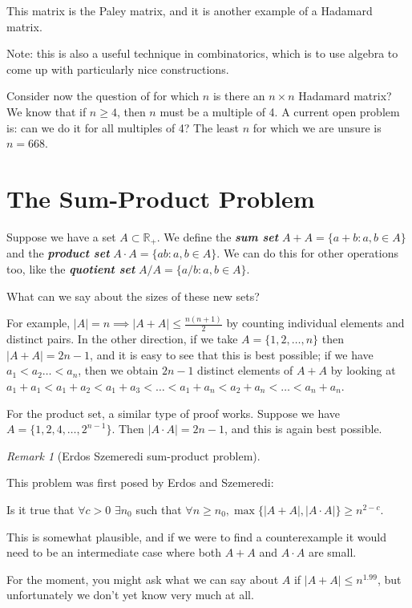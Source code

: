 \documentclass[]{article}
\theoremstyle{custhm}
\theoremstyle{cusdef}
\theoremstyle{custhm}
\theoremstyle{custhm}
\theoremstyle{custhm}
\theoremstyle{custhm}
\theoremstyle{cusdef}
\theoremstyle{remark}
\newtheorem*{remark*}{Remark}
\theoremstyle{custhm}
\newcommand{\R}{\mathbb{R}}
\newcommand{\undf}[1]{\textit{\textbf{#1}}}
\begin{document}
This matrix is the Paley matrix, and it is another example of a Hadamard matrix.

Note: this is also a useful technique in combinatorics, which is to use algebra to come up with particularly nice constructions.

Consider now the question of for which $n$ is there an $n\times n$ Hadamard matrix? We know that if $n\ge 4$, then $n$ must be a multiple of 4. A current open problem is: can we do it for all multiples of 4? The least $n$ for which we are unsure is $n = 668$.

\section{The Sum-Product Problem}

Suppose we have a set $A\subset \R_{+}$. We define the \undf{sum set} $A + A = \{a+b:a,b\in A\}$ and the \undf{product set} $A\cdot A = \{ab:a,b\in A\}$. We can do this for other operations too, like the \undf{quotient set} $A/A = \{a/b:a,b\in A\}$.

What can we say about the sizes of these new sets?

For example, $|A| = n \implies |A+A| \le \frac{n(n+1)}{2}$ by counting individual elements and distinct pairs. In the other direction, if we take $A = \{1,2,\dots,n\}$ then $|A+A| = 2n-1$, and it is easy to see that this is best possible; if we have $a_1<a_2\dots < a_n$, then we obtain $2n-1$ distinct elements of $A+A$ by looking at $a_1+a_1 < a_1 + a_2 < a_1 + a _3 <\dots <a_1 + a_n < a_2 + a_n <\dots < a_n + a_n$.

For the product set, a similar type of proof works. Suppose we have $A = \{1,2,4,\dots,2^{n-1}\}$. Then $|A\cdot A| = 2n-1$, and this is again best possible.

\begin{remark*}[Erdos Szemeredi sum-product problem]\ 

This problem was first posed by Erdos and Szemeredi:

Is it true that $\forall c > 0$ $\exists n_0$ such that $\forall n\ge n_0, \max\{|A+A|,|A\cdot A|\}\ge n^{2-c}$.
\end{remark*}

This is somewhat plausible, and if we were to find a counterexample it would need to be an intermediate case where both $A+A$ and $A\cdot A$ are small.

For the moment, you might ask what we can say about $A$ if $|A + A| \le n^{1.99}$, but unfortunately we don't yet know very much at all.
\end{document}
